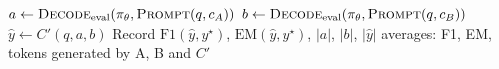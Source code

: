 \documentclass[11pt]{article}
\begin{document}
\begin{algorithm}[htbp]
\caption{Evaluation procedure shared by Algorithms~\ref{alg:cross-grpo} and~\ref{alg:sft-c}}
\label{alg:eval}
\begin{algorithmic}[1]
    \State $a \gets \textsc{Decode}_{\mathrm{eval}}(\pi_\theta, \textsc{Prompt}(q, c_A))$
    \State $b \gets \textsc{Decode}_{\mathrm{eval}}(\pi_\theta, \textsc{Prompt}(q, c_B))$
    \State $\hat{y} \gets C'(q, a, b)$
    \State Record $\mathrm{F1}(\hat{y}, y^\star)$, $\mathrm{EM}(\hat{y}, y^\star)$,
      $|a|$, $|b|$, $|\hat{y}|$
  \EndFor
  \State \Return averages: F1, EM, tokens generated by A, B and $C'$
\EndFunction
\end{algorithmic}
\end{algorithm}
\end{document}
